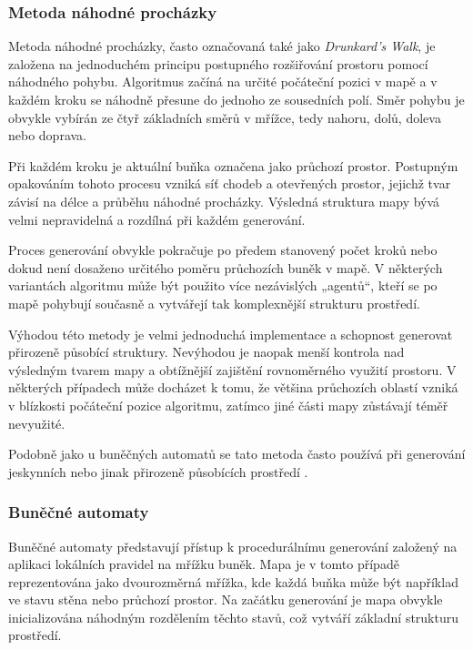 \documentclass[
  program=itk,
  biblatex,
  figures=false,
  glossaries,
  index
]{kidiplom}
\begin{document}
\subsubsection{Metoda náhodné procházky}

Metoda náhodné procházky, často označovaná také jako \textit{Drunkard's Walk}, je založena na jednoduchém principu postupného rozšiřování prostoru pomocí náhodného pohybu. Algoritmus začíná na určité počáteční pozici v mapě a v každém kroku se náhodně přesune do jednoho ze sousedních polí. Směr pohybu je obvykle vybírán ze čtyř základních směrů v mřížce, tedy nahoru, dolů, doleva nebo doprava.

Při každém kroku je aktuální buňka označena jako průchozí prostor. Postupným opakováním tohoto procesu vzniká síť chodeb a otevřených prostor, jejichž tvar závisí na délce a průběhu náhodné procházky. Výsledná struktura mapy bývá velmi nepravidelná a rozdílná při každém generování.

Proces generování obvykle pokračuje po předem stanovený počet kroků nebo dokud není dosaženo určitého poměru průchozích buněk v mapě. V některých variantách algoritmu může být použito více nezávislých „agentů“, kteří se po mapě pohybují současně a vytvářejí tak komplexnější strukturu prostředí.

Výhodou této metody je velmi jednoduchá implementace a schopnost generovat přirozeně působící struktury. Nevýhodou je naopak menší kontrola nad výsledným tvarem mapy a obtížnější zajištění rovnoměrného využití prostoru. V některých případech může docházet k tomu, že většina průchozích oblastí vzniká v blízkosti počáteční pozice algoritmu, zatímco jiné části mapy zůstávají téměř nevyužité.

Podobně jako u buněčných automatů se tato metoda často používá při generování jeskynních nebo jinak přirozeně působících prostředí \cite{Shaker2016}.


\subsubsection{Buněčné automaty}

Buněčné automaty představují přístup k procedurálnímu generování založený na aplikaci lokálních pravidel na mřížku buněk. Mapa je v tomto případě reprezentována jako dvourozměrná mřížka, kde každá buňka může být například ve stavu stěna nebo průchozí prostor. Na začátku generování je mapa obvykle inicializována náhodným rozdělením těchto stavů, což vytváří základní strukturu prostředí.
\end{document}
